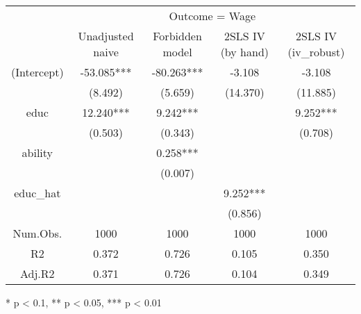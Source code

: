 \documentclass[20pt]{article}
\begin{document}

\setlength\LTleft{0in}
\setlength\LTright{0in}      

\begin{landscape}
\begingroup
\LARGE


\captionsetup[table]{font=normal,skip=0pt}
\begin{longtable}{@{\extracolsep{\fill}}ccccc}
\toprule
& \multicolumn{4}{c}{Outcome = Wage} \\ 
 \cmidrule(lr){2-5}
        & Unadjusted naive & Forbidden model & 2SLS IV (by hand) & 2SLS IV (iv\_robust) \\ 
\midrule\relax
(Intercept) & -53.085*** & -80.263*** & -3.108 & -3.108 \\ 
 & (8.492) & (5.659) & (14.370) & (11.885) \\ 
educ & 12.240*** & 9.242*** &  & 9.252*** \\ 
 & (0.503) & (0.343) &  & (0.708) \\ 
ability &  & 0.258*** &  &  \\ 
 &  & (0.007) &  &  \\ 
educ\_hat &  &  & 9.252*** &  \\ 
 &  &  & (0.856) &  \\ 
\midrule
Num.Obs. & 1000 & 1000 & 1000 & 1000 \\ 
R2 & 0.372 & 0.726 & 0.105 & 0.350 \\ 
Adj.R2 & 0.371 & 0.726 & 0.104 & 0.349 \\ 
\bottomrule
\end{longtable}
\begin{minipage}{\linewidth}
* p < 0.1, ** p < 0.05, *** p < 0.01\\ 
\end{minipage}

\endgroup
\end{landscape}
\end{document}

